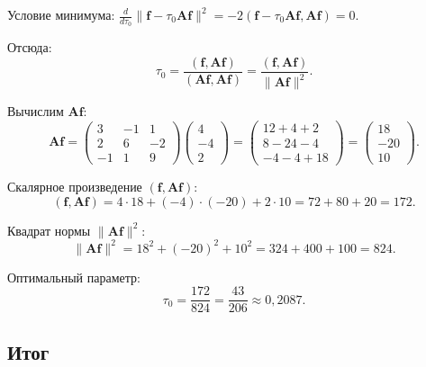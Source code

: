 \documentclass{article}
\begin{document}
Условие минимума: $\frac{d}{d\tau_0}\|\mathbf{f} - \tau_0 \mathbf{A}\mathbf{f}\|^2 = -2(\mathbf{f} - \tau_0 \mathbf{A}\mathbf{f}, \mathbf{A}\mathbf{f}) = 0$.

Отсюда:
\begin{equation}
\tau_0 = \frac{(\mathbf{f}, \mathbf{A}\mathbf{f})}{(\mathbf{A}\mathbf{f}, \mathbf{A}\mathbf{f})} = \frac{(\mathbf{f}, \mathbf{A}\mathbf{f})}{\|\mathbf{A}\mathbf{f}\|^2}.
\end{equation}

Вычислим $\mathbf{A}\mathbf{f}$:
\begin{equation}
\mathbf{A}\mathbf{f} = \begin{pmatrix} 3 & -1 & 1 \\ 2 & 6 & -2 \\ -1 & 1 & 9 \end{pmatrix} \begin{pmatrix} 4 \\ -4 \\ 2 \end{pmatrix} = \begin{pmatrix} 12 + 4 + 2 \\ 8 - 24 - 4 \\ -4 - 4 + 18 \end{pmatrix} = \begin{pmatrix} 18 \\ -20 \\ 10 \end{pmatrix}.
\end{equation}

Скалярное произведение $(\mathbf{f}, \mathbf{A}\mathbf{f})$:
\begin{equation}
(\mathbf{f}, \mathbf{A}\mathbf{f}) = 4 \cdot 18 + (-4) \cdot (-20) + 2 \cdot 10 = 72 + 80 + 20 = 172.
\end{equation}

Квадрат нормы $\|\mathbf{A}\mathbf{f}\|^2$:
\begin{equation}
\|\mathbf{A}\mathbf{f}\|^2 = 18^2 + (-20)^2 + 10^2 = 324 + 400 + 100 = 824.
\end{equation}

Оптимальный параметр:
\begin{equation}
\boxed{\tau_0 = \frac{172}{824} = \frac{43}{206} \approx 0,2087.}
\end{equation}

\subsection*{Итог}
\end{document}
